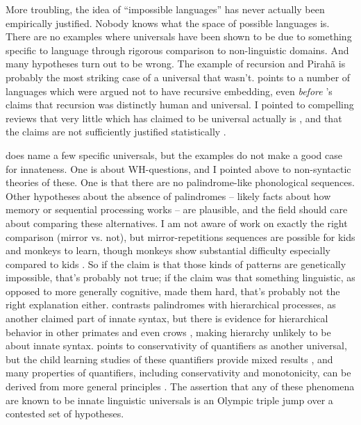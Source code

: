 \documentclass[output=paper,colorlinks,citecolor=brown
]{langscibook}
\begin{document}

More troubling, the idea of ``impossible languages'' has never actually been empirically justified. Nobody knows what the space of possible languages is. There are no examples where universals have been shown to be due to something specific to language through rigorous comparison to non-linguistic domains. And many hypotheses turn out to be wrong. The example of recursion and Pirah\~{a} is probably the most striking case of a universal that wasn't. \citet{pullum2023dan} points to a number of languages which were argued not to have recursive embedding, even \textit{before} \citet{hauser2002faculty}'s claims that recursion was distinctly human and universal. I pointed to compelling reviews that very little which has claimed to be universal actually is \citep{evans2009myth}, and that the claims are not sufficiently justified statistically \citep{piantadosi2014quantitative}. 

\citet{katzir2023large} does name a few specific universals, but the examples do not make a good case for innateness. One is about WH-questions, and I pointed above to non-syntactic theories of these. One is that there are no palindrome-like phonological sequences. Other hypotheses about the absence of palindromes -- likely facts about how memory or sequential processing works -- are plausible, and the field should care about comparing these alternatives. I am not aware of work on exactly the right comparison (mirror vs. not), but mirror-repetitions sequences are possible for kids and monkeys to learn, though monkeys show substantial difficulty especially compared to kids \citep{jiang2018production}. So if the claim is that those kinds of patterns are genetically impossible, that's probably not true; if the claim was that something linguistic, as opposed to more generally cognitive, made them hard, that's probably not the right explanation either. \citet{katzir2023large} contrasts palindromes with hierarchical processes, as another claimed part of innate syntax, but there is evidence for hierarchical behavior in other primates \citep{ferrigno2020recursive,voloh2023hierarchical} and even crows \citep{liao2022recursive}, making hierarchy unlikely to be about innate syntax. \citet{katzir2023large} points to conservativity of quantifiers as another universal, but the child learning studies of these quantifiers provide mixed results \citep{spenader2019conservative}, and many properties of quantifiers, including conservativity and monotonicity, can be derived from more general principles \citep{steinert2019learnability,carcassi2021monotone,van2021quantifiers,steinert2021quantifiers}.
The assertion that any of these phenomena are known to be innate linguistic universals is an Olympic triple jump over a contested set of hypotheses. 
\end{document}
